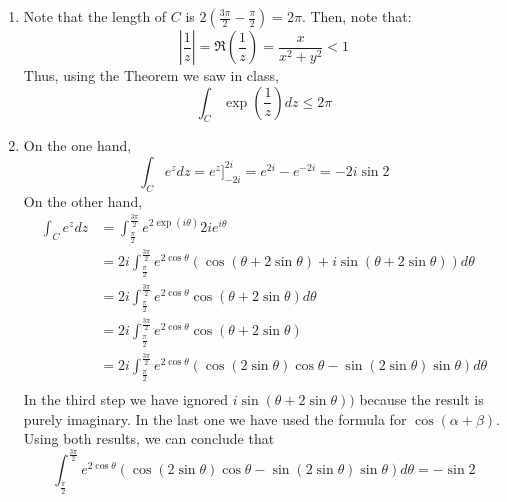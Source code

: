\documentclass{article}
\renewcommand{\exp}[1]{\operatorname{exp}\left(#1\right)}
\begin{document}
    \begin{enumerate}[label=(\alph*)]
        \item Note that the length of $C$ is $2\left(\frac{3\pi}{2} - \frac{\pi}{2}\right) = 2\pi$. Then, note that:
        \begin{equation*}
            \left|\frac{1}{z}\right| = \Re\left(\frac{1}{z}\right) = \frac{x}{x^2 + y^2} < 1
        \end{equation*}
        Thus, using the Theorem we saw in class, 
        \begin{equation*}
            \int_C{\exp{\frac{1}{z}}}dz \leq 2\pi
        \end{equation*}
        \item On the one hand,
        \begin{equation*}
            \int_C e^z dz = e^z \Bigr]^{2i}_{-2i} = e^{2i} - e^{-2i} = -2i\sin{2}
        \end{equation*}
        On the other hand,
        \begin{align*}
            \int_C e^z dz &= \int_{\frac{\pi}{2}}^{\frac{3\pi}{2}} e^{2\exp{i\theta}} 2 i e^{i \theta} \\
            &= 2i\int_{\frac{\pi}{2}}^{\frac{3\pi}{2}} e^{2\cos{\theta}} \left(\cos(\theta + 2\sin \theta) + i\sin(\theta + 2\sin \theta)\right) d\theta \\
            &= 2i\int_{\frac{\pi}{2}}^{\frac{3\pi}{2}} e^{2\cos{\theta}} \cos(\theta + 2\sin \theta) d\theta\\
            &= 2i\int_{\frac{\pi}{2}}^{\frac{3\pi}{2}} e^{2\cos{\theta}} \cos(\theta + 2\sin \theta) \\
            &= 2i \int_{\frac{\pi}{2}}^{\frac{3\pi}{2}} e^{2\cos{\theta}}(\cos(2\sin{\theta})\cos{\theta} - \sin(2\sin{\theta})\sin{\theta}) d\theta \\
        \end{align*}
        In the third step we have ignored $i\sin(\theta + 2\sin \theta))$ because the result is purely imaginary. In the last one we have used the formula for $\cos(\alpha + \beta)$. Using both results, we can conclude that
        \begin{equation*}
            \int_{\frac{\pi}{2}}^{\frac{3\pi}{2}} e^{2\cos{\theta}}(\cos(2\sin{\theta})\cos{\theta} - \sin(2\sin{\theta})\sin{\theta}) d\theta = -\sin{2}
        \end{equation*}
    \end{enumerate}
\end{document}
